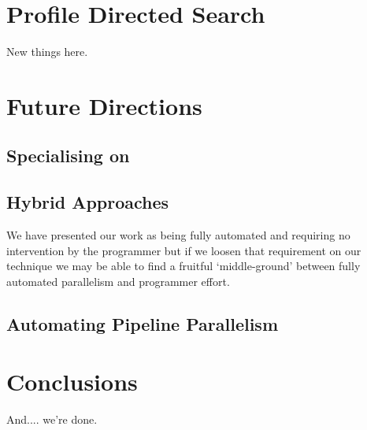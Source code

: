 \documentclass[justified, twoside, a4paper, symmetric]{tufte-book}
\begin{document}
\chapter{Profile Directed Search}

    New things here.
    \label{sec:informed-search}
    


\chapter{Future Directions}

    \section{Specialising on \underline{\hspace{2cm}}}

    \section{Hybrid Approaches}

        We have presented our work as being fully automated and requiring no
        intervention by the programmer but if we loosen that requirement on
        our technique we may be able to find a fruitful `middle-ground' between
        fully automated parallelism and programmer effort.

    \section{Automating Pipeline Parallelism}


\chapter{Conclusions}

    And.... we're done.

\listoftodos[Notes]

\backmatter



\end{document}
